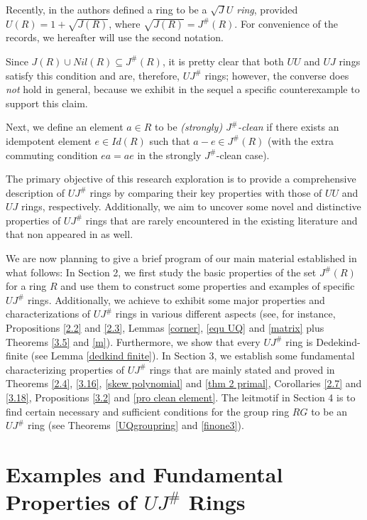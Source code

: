 \documentclass[12pt]{amsart}
\theoremstyle{definition}
\begin{document}
Recently, in \cite{SU} the authors defined a ring to be a {\it $\sqrt{J}U$ ring}, provided $U(R) = 1 + \sqrt{J(R)}$, where $\sqrt{J(R)}=J^{\#}(R)$. For convenience of the records, we hereafter will use the second notation.

Since $J(R)\cup Nil(R)\subseteq J^{\#}(R)$, it is pretty clear that both $UU$ and $UJ$ rings satisfy this condition and are, therefore, $UJ^{\#}$ rings; however, the converse does {\it not} hold in general, because we exhibit in the sequel a specific counterexample to support this claim.

Next, we define an element $a \in R$ to be {\it (strongly) $J^{\#}$-clean} if there exists an idempotent element $e \in Id(R)$ such that $a - e \in J^{\#}(R)$ (with the extra commuting condition $ea = ae$ in the strongly $J^{\#}$-clean case).

The primary objective of this research exploration is to provide a comprehensive description of $UJ^{\#}$ rings by comparing their key properties with those of $UU$ and $UJ$ rings, respectively. Additionally, we aim to uncover some novel and distinctive properties of $UJ^{\#}$ rings that are rarely encountered in the existing literature and that non appeared in \cite{SU} as well.

We are now planning to give a brief program of our main material established in what follows: In Section 2, we first study the basic properties of the set $J^{\#}(R)$ for a ring $R$ and use them to construct some properties and examples of specific $UJ^{\#}$ rings. Additionally, we achieve to exhibit some major properties and characterizations of $UJ^{\#}$ rings in various different aspects (see, for instance, Propositions \ref{2.2} and \ref{2.3}, Lemmas \ref{corner}, \ref{equ UQ} and \ref{matrix} plus Theorems \ref{3.5} and \ref{m}). Furthermore, we show that every $UJ^{\#}$ ring is Dedekind-finite (see Lemma \ref{dedkind finite}). In Section 3, we establish some fundamental characterizing properties of $UJ^{\#}$ rings that are mainly stated and proved in Theorems \ref{2.4}, \ref{3.16}, \ref{skew polynomial} and \ref{thm 2 primal}, Corollaries \ref{2.7} and \ref{3.18}, Propositions \ref{3.2} and \ref{pro clean element}. The leitmotif in Section 4 is to find certain necessary and sufficient conditions for the group ring $RG$ to be an $UJ^{\#}$ ring (see Theorems~\ref{UQgroupring} and \ref{finone3}).

\section{Examples and Fundamental Properties of $UJ^{\#}$ Rings}
\end{document}

